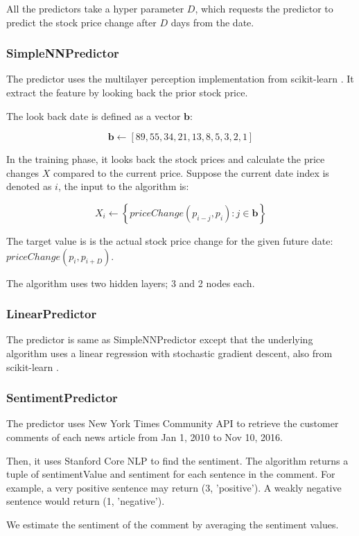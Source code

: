 \documentclass[twocolumn,10pt]{asme2ej}
\newcommand{\vect}[1]{\boldsymbol{#1}}
\begin{document}
All the predictors take a hyper parameter $D$, which requests the
predictor to predict the stock price change after $D$ days from the date.

\subsubsection{SimpleNNPredictor}
The predictor uses the multilayer perception implementation from
scikit-learn \cite{web:scikit_learn}. It extract the feature by
looking back the prior stock price.

The look back date is defined as a vector $\vect{b}$:

\[
\vect{b} \gets [89, 55, 34, 21, 13, 8, 5, 3, 2, 1]
\]

In the training phase, it looks back the stock prices and calculate
the price changes $X$ compared to the current price. Suppose the
current date index is denoted as $i$, the input to the algorithm is:

\[
X_i \gets \left\{priceChange(p_{i - j}, p_i) : j \in \vect{b}\right\}
\]

The target value is is the actual stock price change for the given
future date: $priceChange(p_i, p_{i+D})$.

The algorithm uses two hidden layers; 3 and 2 nodes each.

\subsubsection{LinearPredictor}
The predictor is same as SimpleNNPredictor except that the underlying
algorithm uses a linear regression with stochastic gradient descent,
also from scikit-learn \cite{web:scikit_learn}.

\subsubsection{SentimentPredictor}

The predictor uses New York Times Community API
\cite{web:nytimes_community_api} to retrieve the customer comments of
each news article from Jan 1, 2010 to Nov 10, 2016.

Then, it uses Stanford Core NLP \cite{manning-EtAl:2014:P14-5} to find
the sentiment. The algorithm returns a tuple of sentimentValue and
sentiment for each sentence in the comment. For example, a very
positive sentence may return (3, 'positive'). A weakly negative
sentence would return (1, 'negative').

We estimate the sentiment of the comment by averaging the sentiment
values.
\end{document}
